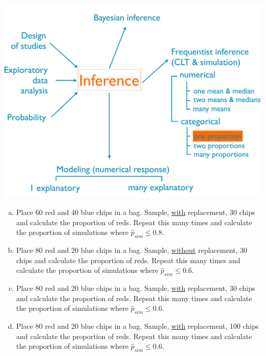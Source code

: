 \documentclass[slidestop,compress,mathserif,12pt,t,professionalfonts,xcolor=table]{beamer}
\newcommand{\solnMult}[1]{#1}
\begin{document}
\begin{frame}

{
{\scriptsize
{}}}
{
 \includegraphics[width=\textwidth]{figures/map/one_prop}
}

\vfill

{\footnotesize
\begin{enumerate}[(a)]
\item Place 60 red and 40 blue chips in a bag. Sample, \underline{with} replacement, 30 chips and calculate the proportion of reds. Repeat this many times and calculate the proportion of simulations where $\hat{p}_{sim} \le 0.8$. 
\item Place 80 red and 20 blue chips in a bag. Sample, \underline{without} replacement, 30 chips and calculate the proportion of reds. Repeat this many times and calculate the proportion of simulations where $\hat{p}_{sim} \le 0.6$.
\item \solnMult{Place 80 red and 20 blue chips in a bag. Sample, \underline{with} replacement, 30 chips and calculate the proportion of reds. Repeat this many times and calculate the proportion of simulations where $\hat{p}_{sim} \le 0.6$.}
\item Place 80 red and 20 blue chips in a bag. Sample, \underline{with} replacement, 100 chips and calculate the proportion of reds. Repeat this many times and calculate the proportion of simulations where $\hat{p}_{sim} \le 0.6$. 
\end{enumerate}
}

\end{frame}

\end{document}
